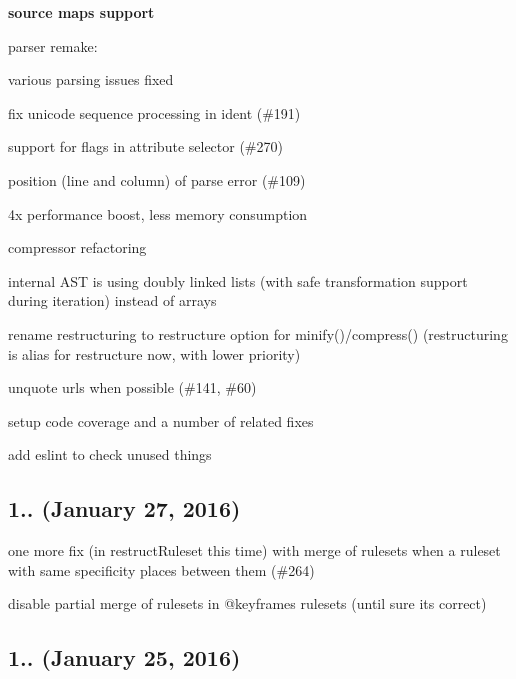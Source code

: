 \begin{DoxyItemize}
\item {\bfseries source maps support}
\item parser remake\+:
\begin{DoxyItemize}
\item various parsing issues fixed
\item fix unicode sequence processing in ident (\#191)
\item support for flags in attribute selector (\#270)
\item position (line and column) of parse error (\#109)
\item 4x performance boost, less memory consumption
\end{DoxyItemize}
\item compressor refactoring
\begin{DoxyItemize}
\item internal A\+ST is using doubly linked lists (with safe transformation support during iteration) instead of arrays
\item rename {\ttfamily restructuring} to {\ttfamily restructure} option for {\ttfamily minify()}/{\ttfamily compress()} ({\ttfamily restructuring} is alias for {\ttfamily restructure} now, with lower priority)
\item unquote urls when possible (\#141, \#60)
\end{DoxyItemize}
\item setup code coverage and a number of related fixes
\item add eslint to check unused things
\end{DoxyItemize}

\subsection*{1.. (January 27, 2016)}


\begin{DoxyItemize}
\item one more fix (in {\ttfamily restruct\+Ruleset} this time) with merge of rulesets when a ruleset with same specificity places between them (\#264)
\item disable partial merge of rulesets in {\ttfamily @keyframes} rulesets (until sure it\textquotesingle{}s correct)
\end{DoxyItemize}

\subsection*{1.. (January 25, 2016)}


